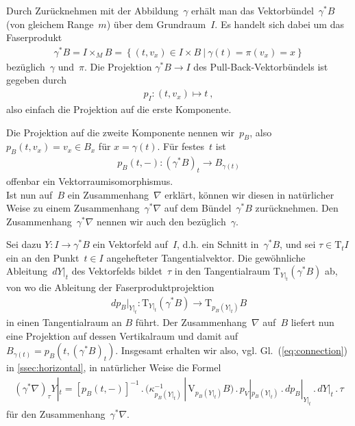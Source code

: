 \documentclass[10pt,a4paper]{article}
\newcommand{\mydef}[1]{\textls{#1}}
\begin{document}
Durch Zurücknehmen mit der Abbildung~$\gamma$ erhält man das Vektorbündel~$\gamma^*B$ (von gleichem Range~$m$) über dem Grundraum~$I$.
Es handelt sich dabei um das Faserprodukt
\begin{align*}
\gamma^*B = I \times_M B = 
\left\{
(t, v_x) \in I\times B\ |\ \gamma(t)=\pi(v_x)=x
\right\}
\end{align*}
bezüglich~$\gamma$ und~$\pi$.
Die Projektion $\gamma^*B\rightarrow I$ des Pull-Back-Vektorbündels ist gegeben durch
\begin{align*}
p_I: (t, v_x)\mapsto t
\ ,
\end{align*}
also einfach die Projektion auf die erste Komponente.

Die Projektion auf die zweite Komponente nennen wir~$p_B$, also $p_B(t,v_x)=v_x\in B_x$ für $x=\gamma(t)$.
Für festes~$t$ ist 
\begin{align*}
p_B(t,-): (\gamma^*B)_t\rightarrow B_{\gamma(t)}
\end{align*}
offenbar ein Vektorraum\-isomorphismus.\\

Ist nun auf~$B$ ein Zusammenhang~$\nabla$ erklärt, können wir diesen in natürlicher Weise zu einem Zusammenhang~$\gamma^*\nabla$ auf dem Bündel~$\gamma^*B$ zurücknehmen.
Den Zusammenhang~$\gamma^*\nabla$ nennen wir auch den \mydef{Pull-Back-Zusammenhang} bezüglich~$\gamma$.

Sei dazu $Y:I\rightarrow\gamma^*B$ ein Vektorfeld auf~$I$, d.h. ein Schnitt in~$\gamma^*B$, und sei $\tau\in\mathrm{T}_tI$ ein an den Punkt~$t\in I$ angehefteter Tangential\-vektor.
Die gewöhnliche Ableitung~$dY|_t$ des Vektorfelds bildet~$\tau$ in den Tangential\-raum $\mathrm{T}_{Y|_t}(\gamma^*B)$ ab, von wo die Ableitung der Faserprodukt\-projektion
\begin{align*}
dp_B|_{Y|_t}:
\mathrm{T}_{Y|_t}(\gamma^*B)
\rightarrow 
\mathrm{T}_{p_B(Y|_t)}B
\end{align*}
in einen Tangential\-raum an $B$ führt.
Der Zusammenhang~$\nabla$ auf~$B$ liefert nun eine Projektion auf dessen Vertikal\-raum und damit auf~$B_{\gamma(t)}=p_B(t,(\gamma^*B)_t)$.
Insgesamt erhalten wir also, vgl. Gl.~(\ref{eq:connection}) in \ref{ssec:horizontal}, in natürlicher Weise die Formel
\begin{align}
\label{eq:pullback}
(\gamma^*\nabla)_\tau Y|_t
= 
[p_B(t,-)]^{-1}\,.\,
(\kappa_{p_B(Y|_t)}^{-1}\,|\,\mathrm{V}_{p_B(Y|_t)}B)\,.\,
p_V|_{p_B(Y|_t)}\,.\,
dp_B|_{Y|_t}\,.\,
dY|_t
\,.\,\tau
\end{align}
für den Zusammenhang~$\gamma^*\nabla$.\\
\end{document}
